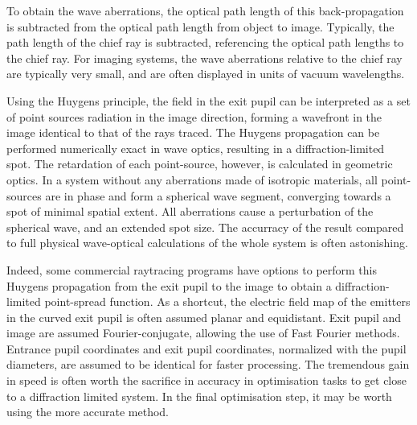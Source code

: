 \documentclass[12pt,a4paper,twoside,openright,BCOR10mm,headsepline,titlepage,abstracton,chapterprefix,final]{scrreprt}
\begin{document}
To obtain the wave aberrations, the optical path length of this back-propagation is subtracted from the optical path length from object to image.
Typically, the path length of the chief ray is subtracted, referencing the optical path lengths to the chief ray. 
For imaging systems, the wave aberrations relative to the chief ray are typically very small, and are often displayed in units of vacuum wavelengths.

Using the Huygens principle, the field in the exit pupil can be interpreted as a set of point sources radiation in the image direction, forming a wavefront in the image identical to that of the rays traced.
The Huygens propagation can be performed numerically exact in wave optics, resulting in a diffraction-limited spot. 
The retardation of each point-source, however, is calculated in geometric optics.
In a system without any aberrations made of isotropic materials, all point-sources are in phase and form a spherical wave segment, converging towards a spot of minimal spatial extent.
All aberrations cause a perturbation of the spherical wave, and an extended spot size.
The accurracy of the result compared to full physical wave-optical calculations of the whole system is often astonishing. 

Indeed, some commercial raytracing programs have options to perform this Huygens propagation from the exit pupil to the image to obtain a diffraction-limited point-spread function.
As a shortcut, the electric field map of the emitters in the curved exit pupil is often assumed planar and equidistant. Exit pupil and image are assumed Fourier-conjugate, allowing the use of Fast Fourier methods.
Entrance pupil coordinates and exit pupil coordinates, normalized with the pupil diameters, are assumed to be identical for faster processing.
The tremendous gain in speed is often worth the sacrifice in accuracy in optimisation tasks to get close to a diffraction limited system.
In the final optimisation step, it may be worth using the more accurate method.
\end{document}
